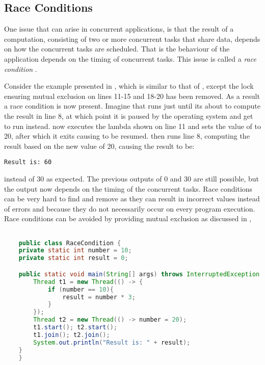 \subsection{Race Conditions}\label{subsec:race_coditions}
One issue that can arise in concurrent applications, is that the result of a computation, consisting of two or more concurrent tasks that share data, depends on how the concurrent tasks are scheduled. That is the behaviour of the application depends on the timing of concurrent tasks. This issue is called a \emph{race condition}
\cite[p. 983]{bryant2011computer}\cite[p. 115]{tanenbaum2008modern}\cite[p. 44]{sevenModels}. 

Consider the example presented in , which is similar to that of , except the lock ensuring mutual exclusion on lines 11-15 and 18-20 has been removed. As a result a race condition is now present. Imagine that  runs just until its about to compute the result in line 8, at which point it is paused by the operating system and  get to run instead.  now executes the lambda shown on line 11 and sets the value of  to 20, after which it exits causing  to be resumed.  then runs line 8, computing the result based on the new  value of 20, causing the result to be:
\begin{verbatim}
Result is: 60
\end{verbatim}
instead of 30 as expected. The previous outputs of 0 and 30 are still possible, but the output now depends on the timing of the concurrent tasks. Race conditions can be very hard to find and remove as they can result in incorrect values instead of errors and because they do not necessarily occur on every program execution. Race conditions can be avoided by providing mutual exclusion as discussed in ,
\begin{lstlisting}[label=lst:racecondition,
  caption={Race condition example},
  language=Java,  
  showspaces=false,
  showtabs=false,
  breaklines=true,
  showstringspaces=false,
  breakatwhitespace=true,
  commentstyle=\color{greencomments},
  keywordstyle=\color{bluekeywords},
  stringstyle=\color{redstrings}]  % Start your code-block

	public class RaceCondition {
    private static int number = 10;
    private static int result = 0;

    public static void main(String[] args) throws InterruptedException {
        Thread t1 = new Thread(() -> {
            if (number == 10){
                result = number * 3;
            }
        });
        Thread t2 = new Thread(() -> number = 20);
        t1.start(); t2.start();
        t1.join(); t2.join();
        System.out.println("Result is: " + result);
    }
	}
\end{lstlisting}
 
